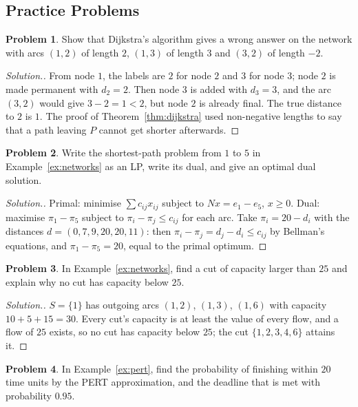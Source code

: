 \documentclass[11pt,a4paper]{article}
\numberwithin{equation}{section}
\theoremstyle{definition}
\newtheorem{problemx}{Problem}[subsection]
\newenvironment{problem}{\begin{problemx}}{\end{problemx}}
\newenvironment{solution}
  {\renewcommand{\qedsymbol}{}\begin{proof}[\textit{Solution}.]}
  {\end{proof}}
\begin{document}
\subsection{Practice Problems}

\begin{problem}
\label{prob:negative}
Show that Dijkstra's algorithm gives a wrong answer on the network with arcs $(1, 2)$ of length $2$, $(1, 3)$ of length $3$ and $(3, 2)$ of length $-2$.
\end{problem}

\begin{solution}
From node $1$, the labels are $2$ for node $2$ and $3$ for node $3$; node $2$ is made permanent with $d_2 = 2$. Then node $3$ is added with $d_3 = 3$, and the arc $(3, 2)$ would give $3 - 2 = 1 < 2$, but node $2$ is already final. The true distance to $2$ is $1$. The proof of Theorem~\ref{thm:dijkstra} used non-negative lengths
to say that a path leaving $P$ cannot get shorter afterwards.
\end{solution}

\begin{problem}
Write the shortest-path problem from $1$ to $5$ in Example~\ref{ex:networks} as an LP, write its dual, and give an optimal dual solution.
\end{problem}

\begin{solution}
Primal: minimise $\sum c_{ij}x_{ij}$ subject to $Nx = e_1 - e_5$, $x \geq 0$. Dual: maximise $\pi_1 - \pi_5$ subject to $\pi_i - \pi_j \leq c_{ij}$ for each arc. Take $\pi_i = 20 - d_i$ with the distances $d = (0, 7, 9, 20, 20, 11)$: then $\pi_i - \pi_j = d_j - d_i \leq c_{ij}$ by Bellman's equations, and
$\pi_1 - \pi_5 = 20$, equal to the primal optimum.
\end{solution}

\begin{problem}
In Example~\ref{ex:networks}, find a cut of capacity larger than $25$ and explain why no cut has capacity below $25$.
\end{problem}

\begin{solution}
$S = \{1\}$ has outgoing arcs $(1, 2)$, $(1, 3)$, $(1, 6)$ with capacity $10 + 5 + 15 = 30$. Every cut's capacity is at least the value of every flow, and a flow of $25$ exists, so no cut has capacity below $25$; the cut $\{1, 2, 3, 4, 6\}$ attains it.
\end{solution}

\begin{problem}
In Example~\ref{ex:pert}, find the probability of finishing within $20$ time units by the PERT approximation, and the deadline that is met with probability $0.95$.
\end{problem}
\end{document}
